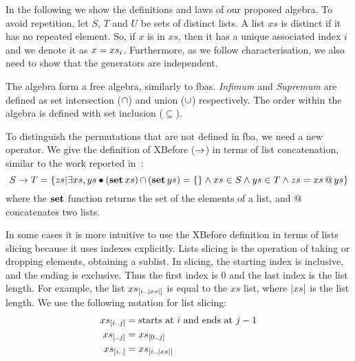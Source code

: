 \documentclass[en,twoside,onehalfspacing,phd]{risethesis}
\makeatletter
\newcommand{\sliceright}[2]{\ensuremath #1_{\left[..#2\right]}}
\newcommand{\sliceleft}[2]{\ensuremath #1_{\left[#2..\right]}}
\newcommand{\slice}[3]{\ensuremath #1_{\left[#2..#3\right]}}
\def\xbeforeop{\ensuremath\rightarrow}
\newcommand{\xbefore}[2]{\ensuremath #1 \xbeforeop #2 }
\newcommand{\nth}[2]{\ensuremath #1_{#2}}
\newcommand{\length}[1]{\ensuremath\left|#1\right|}
\newcommand{\append}[2]{\ensuremath #1 \operatorname{\mathbf{@}} #2}
\def\listsetop{\ensuremath\operatorname{\mathbf{set}}}
\newcommand{\listset}[1]{\ensuremath\listsetop #1}
\def\algebraset{\ensuremath\operatorname{\mathbf{atf}}}
\newcommand{\setsin}[1]{\ensuremath\left\{ #1 \right\}}
\newcommand{\parsin}[1]{\ensuremath\left( #1 \right)}
\def\union{\ensuremath\operatorname{\cup}}
\def\inter{\ensuremath\operatorname{\cap}}
\makeatother
\begin{document}


In the following we show the definitions and laws of our proposed \ac{algebra}.
To avoid repetition, let $S$, $T$ and $U$ be sets of distinct lists.
A list $xs$ is distinct if it has no repeated element.
So, if $x$ is in $xs$, then it has a unique associated index $i$ and we denote it as $x = \nth{xs}{i}$.
Furthermore, as we follow  characterisation, we also need to show that the generators are independent.

The \ac{algebra} form a free algebra, similarly to \acp{fba}.
\emph{Infimum} and \emph{Supremum} are defined as set intersection ($\inter$) and union ($\union$) respectively.
The order within the algebra is defined with set inclusion ($\subseteq$).

To distinguish the permutations that are not defined in \ac{fba}, we need a new operator.
We give the definition of XBefore ($\xbeforeop$) in terms of list concatenation, similar to the work reported in~\cite{DM2015}:
%
\begin{equation}
\label{def:xbefore-append}
\xbefore{S}{T} =
  \setsin{
    zs | \exists xs, ys \bullet \parsin{\listset{xs}} \inter \parsin{\listset{ys}} = \{\}
      \land xs \in S \land ys \in T \land zs = \append{xs}{ys}
  }
\end{equation}
%
where the $\listset{}$ function returns the set of the elements of a list, and $\append{}{}$ concatenates two lists.

In some cases it is more intuitive to use the XBefore definition in terms of lists slicing because it uses indexes explicitly.
Lists slicing is the operation of taking or dropping elements, obtaining a sublist.
In slicing, the starting index is inclusive, and the ending is exclusive.
Thus the first index is 0 and the last index is the list length.
For example, the list $\slice{xs}{i}{\length{xs}}$ is equal to the $xs$ list, where $\length{xs}$ is the list length.
We use the following notation for list slicing:
%
\begin{subequations}
\begin{align}
\slice{xs}{i}{j} &= \text{starts at $i$ and ends at $j-1$}\\
\sliceright{xs}{j} &= \slice{xs}{0}{j}\\
\sliceleft{xs}{i} &= \slice{xs}{i}{\length{xs}}
\end{align}
\end{subequations}
\end{document}
